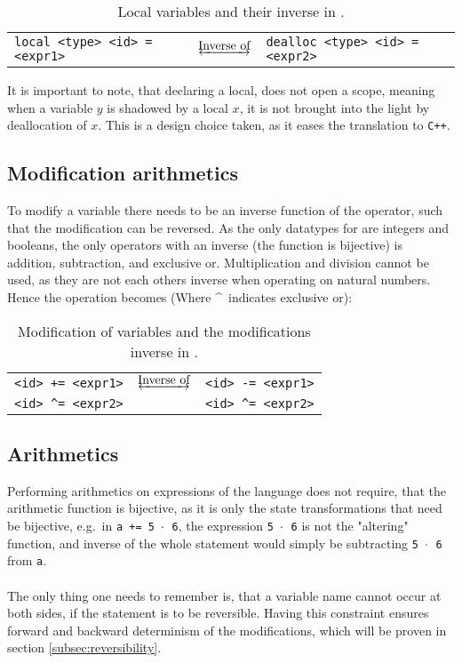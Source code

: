 \begin{table*}[h]
    \centering
    \begin{tabular}{lcl}
        \texttt{local <type> <id> = <expr1>}
        & $\underleftrightarrow{\text{Inverse of}}$ &
        \texttt{dealloc <type> <id> = <expr2>}
    \end{tabular}
    \caption{Local variables and their inverse in \lan.}
\end{table*}
\noindent
It is important to note, that declaring a local, does not open a scope, meaning when a variable
$y$ is shadowed by a local $x$, it is not brought into the light by deallocation of $x$.
This is a design choice taken, as it eases the translation to \texttt{C++}.

\subsection{Modification arithmetics}
To modify a variable there needs to be an inverse function of the operator, such that the
modification can be reversed. As the only datatypes for \lan are integers and booleans,
the only operators with an inverse (the function is bijective) is addition, subtraction, and
exclusive or. Multiplication and division cannot be used, as they are not each others inverse
when operating on natural numbers. Hence the operation becomes
(Where \textasciicircum ~indicates exclusive or):

\begin{table*}[h!]
    \centering
    \begin{tabular}{lcl}
        \texttt{<id> += <expr1>} & $\underleftrightarrow{\text{Inverse of}}$ & \texttt{<id> -= <expr1>} \\
        \texttt{<id> \textasciicircum= <expr2>} & & \texttt{<id> \textasciicircum= <expr2>}
    \end{tabular}
    \caption{Modification of variables and the modifications inverse in \lan.}
\end{table*}

\subsection{Arithmetics}
Performing arithmetics on expressions of the language does not require, that the arithmetic function
is bijective, as it is only the state transformations that need be bijective, e.g.\ in
\texttt{a += 5 $\cdot$ 6}, the expression \texttt{5 $\cdot$ 6} is not the "altering" function, and
inverse of the whole statement would simply be subtracting \texttt{5 $\cdot$ 6} from \texttt{a}.
\\
\\
The only thing one needs to remember is, that a variable name cannot occur at both sides, if the
statement is to be reversible. Having this constraint ensures forward and backward determinism
of the modifications, which will be proven in section \ref{subsec:reversibility}.

